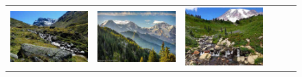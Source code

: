 \begin{figure}
\begin{tabular}{m{.01\linewidth} m{.16\linewidth} m{.16\linewidth} m{.16\linewidth} m{.16\linewidth} m{.16\linewidth}}
    \includegraphics[width=\linewidth]{../style/figures/flickr_on_flickr/pred_style_Serene/1.jpg} &
    \includegraphics[width=\linewidth]{../style/figures/flickr_on_flickr/pred_style_Serene/2.jpg} &
    \includegraphics[width=\linewidth]{../style/figures/flickr_on_flickr/pred_style_Serene/3.jpg} &

\end{tabular}
\end{figure}
